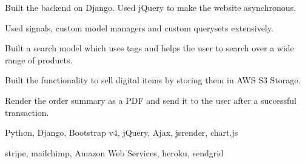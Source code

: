 \begin{tightemize}
\item Built the backend on Django. Used jQuery to make the website asynchronous.
\item Used signals, custom model managers and custom querysets extensively.
\item Built a search model which uses tags and helps the user to search over a wide range of products.
\item Built the functionality to sell digital items by storing them in AWS S3 Storage.
\item Render the order summary as a PDF and send it to the user after a successful transaction.
\item {} Python, Django, Bootstrap v4, jQuery, Ajax, jsrender, chart.js
\item {} stripe, mailchimp, Amazon Web Services, heroku, sendgrid
\end{tightemize}
\sectionsep
